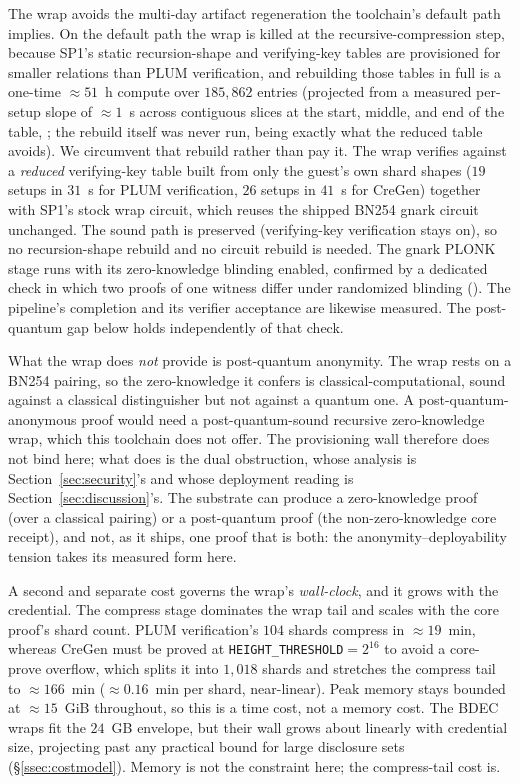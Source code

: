 The wrap avoids the multi-day artifact regeneration the toolchain's default path implies. On the default path the wrap is killed at the recursive-compression step, because SP1's static recursion-shape and verifying-key tables are provisioned for smaller relations than PLUM verification, and rebuilding those tables in full is a one-time ${\approx}51$~h compute over $185{,}862$ entries (projected from a measured per-setup slope of ${\approx}1$~s across contiguous slices at the start, middle, and end of the table, ; the rebuild itself was never run, being exactly what the reduced table avoids). We circumvent that rebuild rather than pay it. The wrap verifies against a \emph{reduced} verifying-key table built from only the guest's own shard shapes ($19$ setups in $31$~s for PLUM verification, $26$ setups in $41$~s for CreGen) together with SP1's stock wrap circuit, which reuses the shipped {BN254} gnark circuit unchanged. The sound path is preserved (verifying-key verification stays on), so no recursion-shape rebuild and no circuit rebuild is needed. The gnark {PLONK} stage runs with its zero-knowledge blinding enabled, confirmed by a dedicated check in which two proofs of one witness differ under randomized blinding (). The pipeline's completion and its verifier acceptance are likewise measured. The post-quantum gap below holds independently of that check.

What the wrap does \emph{not} provide is post-quantum anonymity. The wrap rests on a {BN254} pairing, so the zero-knowledge it confers is classical-computational, sound against a classical distinguisher but not against a quantum one. A post-quantum-anonymous proof would need a post-quantum-sound recursive zero-knowledge wrap, which this toolchain does not offer. The provisioning wall therefore does not bind here; what does is the dual obstruction, whose analysis is Section~\ref{sec:security}'s and whose deployment reading is Section~\ref{sec:discussion}'s. The substrate can produce a zero-knowledge proof (over a classical pairing) or a post-quantum proof (the non-zero-knowledge core receipt), and not, as it ships, one proof that is both: the anonymity--deployability tension takes its measured form here.

A second and separate cost governs the wrap's \emph{wall-clock}, and it grows with the credential. The compress stage dominates the wrap tail and scales with the core proof's shard count. PLUM verification's $104$ shards compress in ${\approx}19$~min, whereas CreGen must be proved at \texttt{HEIGHT\_THRESHOLD}$=2^{16}$ to avoid a core-prove overflow, which splits it into $1{,}018$ shards and stretches the compress tail to ${\approx}166$~min (${\approx}0.16$~min per shard, near-linear). Peak memory stays bounded at ${\approx}15$~GiB throughout, so this is a time cost, not a memory cost. The BDEC wraps fit the $24$~GB envelope, but their wall grows about linearly with credential size, projecting past any practical bound for large disclosure sets (\S\ref{ssec:costmodel}). Memory is not the constraint here; the compress-tail cost is.

